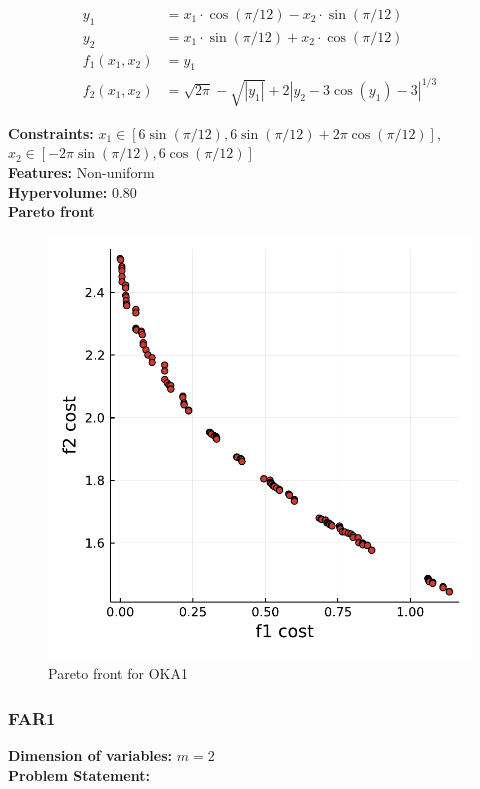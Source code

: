 \documentclass[11pt,oneside,onecolumn,openright]{article}
\begin{document}
  \begin{equation}
  \begin{aligned}
  y_1 &= x_1\cdot \cos(\pi/12)   - x_2\cdot \sin(\pi/12)   \\
      y_2 &=x_1\cdot \sin(\pi/12)   +x_2\cdot \cos(\pi/12) \\
      f_1(x_1, x_2) &= y_1 \\
      f_2(x_1,x_2) &= \sqrt{2\pi} - \sqrt{|y_1|} + 2  |y_2 - 3 \cos(y_1) - 3|^{1/3}
  \end{aligned}
  \end{equation}

  \noindent\textbf{Constraints: } $x_1\in [6\sin(\pi/12), 6\sin(\pi/12)+2\pi \cos(\pi/12)]$, $x_2\in [-2\pi \sin(\pi/12), 6\cos(\pi/12)]$\\
  \noindent\textbf{Features: } Non-uniform\\
  \noindent\textbf{Hypervolume: } 0.80\\
  \noindent\textbf{Pareto front}
      \begin{figure}[H]
      \centering
      \includegraphics[width=12cm]{fig/OKA1.pdf}
      \cprotect\caption{Pareto front for OKA1}
      \end{figure}

   \subsubsection{FAR1~\cite{huband2006review}}
   \textbf{Dimension of variables: }$m=2$\\
  \noindent\textbf{Problem Statement: }
\end{document}
